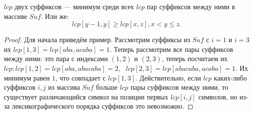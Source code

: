 \begin{enumerate}
       \begin{lemma}
               \label{3.1}
               $lcp$ двух суффиксов --- минимум среди всех $lcp$ пар суффиксов между ними в массиве $Suf$.
               Или же:
               \[
                       lcp[y-1, y] \geq lcp[x, z], x < y \leq z
               .\] 
       \end{lemma}
       \begin{proof}
               Для начала приведём пример. Рассмотрим суффиксы из $Suf$ с $i = 1$ и  $i = 3$ 
               их $lcp[1, 3] = lcp[aba, acaba] = 1$. Теперь рассмотрим все пары суффиксов между ними:
               это пара с индексами $(1, 2)$ и $(2, 3)$, теперь посчитаем их  
               $lcp \colon lcp[1,2] = lcp[aba, abacaba] = 2, \text{ } lcp[2,3] = lcp[abacaba, acaba] = 1$. 
               Их минимум равен $1$, что совпадает с $lcp[1,3]$. Действительно, если  $lcp$ каких-либо 
               суффиксов $i, j$ из массива $Suf$ больше $lcp$ пары суффиксов между ними, то существует
               различающийся символ на позиции первых $lcp[i, j]$ символов, но из-за лексикографического
               порядка суффиксов это невозможно.
       \end{proof}
       

\end{enumerate}
